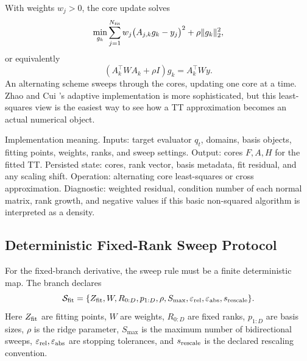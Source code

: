 \documentclass[11pt]{article}
\numberwithin{equation}{section}
\begin{document}
With weights \(w_j>0\), the core update solves
\begin{equation}
    \min_{g_k}
    \sum_{j=1}^{N_{\rm fit}}w_j\bigl(A_{j,k}g_k-y_j\bigr)^2
    +\rho\|g_k\|_2^2,
    \label{eq:p24-a1-2c}
\end{equation}
or equivalently
\begin{equation}
    (A_k^\top W A_k+\rho I)g_k=A_k^\top Wy.
    \label{eq:p24-a1-2d}
\end{equation}
An alternating scheme sweeps through the cores, updating one core at a time.
Zhao and Cui \cite{zhao2024ttsequential}'s adaptive implementation is more sophisticated, but this least-
squares view is the easiest way to see how a TT approximation becomes an
actual numerical object.

Implementation meaning. Inputs: target evaluator \(q_t\), domains,
basis objects, fitting points, weights, ranks, and sweep settings.  Output:
cores \(F,A,H\) for the fitted TT.  Persisted state: cores, rank vector, basis
metadata, fit residual, and any scaling shift.  Operation: alternating core
least-squares or cross approximation.  Diagnostic: weighted residual, condition
number of each normal matrix, rank growth, and negative values if this basic
non-squared algorithm is interpreted as a density.

\subsection*{Deterministic Fixed-Rank Sweep Protocol}

For the fixed-branch derivative, the sweep rule must be a finite deterministic
map.  The branch declares
\begin{equation}
    \mathcal S_{\rm fit}
    =
    \{Z_{\rm fit},W,R_{0:D},p_{1:D},\rho,S_{\max},
      \varepsilon_{\rm rel},\varepsilon_{\rm abs},s_{\rm rescale}\}.
    \label{eq:p24-p23-sweep1}
\end{equation}
Here \(Z_{\rm fit}\) are fitting points, \(W\) are weights, \(R_{0:D}\) are
fixed ranks, \(p_{1:D}\) are basis sizes, \(\rho\) is the ridge parameter,
\(S_{\max}\) is the maximum number of bidirectional sweeps,
\(\varepsilon_{\rm rel},\varepsilon_{\rm abs}\) are stopping tolerances, and
\(s_{\rm rescale}\) is the declared rescaling convention.
\end{document}
